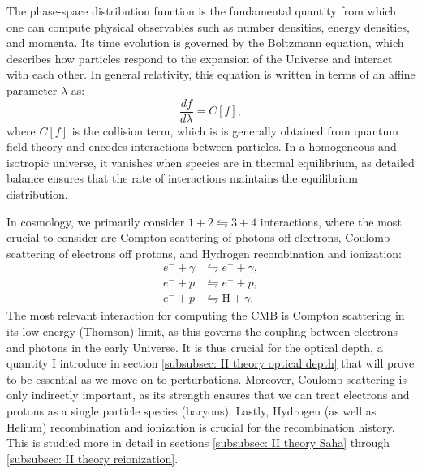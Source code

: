 \documentclass{aa}
\numberwithin{equation}{section}
\numberwithin{table}{section}
\numberwithin{figure}{section}
\begin{document}
The phase-space distribution function is the fundamental quantity from which one can compute physical observables such as number densities, energy densities, and momenta. Its time evolution is governed by the Boltzmann equation, which describes how particles respond to the expansion of the Universe and interact with each other. In general relativity, this equation is written in terms of an affine parameter $\lambda$ as:
\begin{equation}
\frac{df}{d\lambda} = C[f], \label{eq: Boltzmann}
\end{equation}
where $C[f]$ is the collision term, which is is generally obtained from quantum field theory and encodes interactions between particles. In a homogeneous and isotropic universe, it vanishes when species are in thermal equilibrium, as detailed balance ensures that the rate of interactions maintains the equilibrium distribution.

In cosmology, we primarily consider $1+2 \leftrightharpoons 3+4$ interactions, where the most crucial to consider are Compton scattering of photons off electrons, Coulomb scattering of electrons off protons, and Hydrogen recombination and ionization:
\begin{align}
  e^- + \gamma &\leftrightharpoons e^- + \gamma, \\
  e^- + p &\leftrightharpoons e^- + p, \\
  e^- + p &\leftrightharpoons \text{H} + \gamma. \label{eq: Hydrogen recomb}
\end{align}
The most relevant interaction for computing the CMB is Compton scattering in its low-energy (Thomson) limit, as this governs the coupling between electrons and photons in the early Universe. It is thus crucial for the optical depth, a quantity I introduce in section \ref{subsubsec: II theory optical depth} that will prove to be essential as we move on to perturbations. 
Moreover, Coulomb scattering is only indirectly important, as its strength ensures that we can treat electrons and protons as a single particle species (baryons).
Lastly, Hydrogen (as well as Helium) recombination and ionization is crucial for the recombination history. This is studied more in detail in sections \ref{subsubsec: II theory Saha} through \ref{subsubsec: II theory reionization}. 
\end{document}
